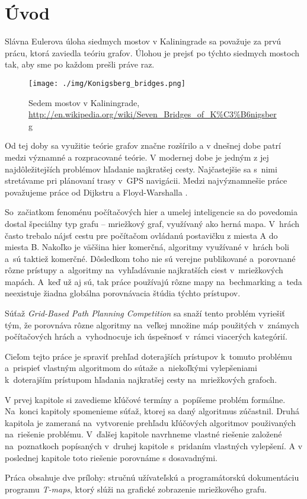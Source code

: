 \chapter*{Úvod}

Slávna Eulerova úloha siedmych mostov v Kaliningrade \cite{euler41} sa považuje za prvú prácu, 
ktorá zaviedla teóriu grafov.
Úlohou je prejsť po týchto siedmych mostoch tak, aby sme po každom prešli práve raz.


\begin{figure}[h]
\centering
\texttt{[image: ./img/Konigsberg\_bridges.png]}
\caption{Sedem mostov v Kaliningrade, \url{http://en.wikipedia.org/wiki/Seven_Bridges_of_K\%C3\%B6nigsberg}}
\label{fig:konigsberg_bridges}
\end{figure}

 
Od tej doby sa využitie teórie grafov značne
rozšírilo a v dnešnej dobe patrí medzi významné
a rozpracované teórie. V modernej dobe je jedným z jej 
naj\-dô\-le\-ži\-tej\-ších 
problémov hľadanie najkratšej cesty. Najčastejšie sa s~nimi stretávame pri plánovaní trasy v~GPS navigácii.
Medzi najvýznamnešie práce považujeme práce od Dijkstru \cite{dijkstra59} a Floyd-Warshalla \cite{floyd62}.

So~začiatkom fenoménu počítačových hier 
a umelej inteligencie sa do povedomia dostal špeciálny typ grafu --
mriežkový graf, využívaný ako herná mapa.
V~hrách často trebalo nájsť cestu pre počítačom
ovládanú postavičku z miesta A do miesta B.
Nakoľko je väčšina hier komerčná, algoritmy
využívané v~hrách boli a~sú taktiež komerčné.
Dôsledkom toho nie sú verejne publikované a~porovnané rôzne prístupy a~algoritmy
na~vyhľadávanie najkratších ciest v~mriežkových mapách. A~keď už aj sú, tak práce používajú rôzne mapy
na~bechmarking a~teda neexistuje žiadna globálna porovnávacia štúdia týchto prístupov.

Súťaž {\sl Grid-Based Path Planning Competition}
 \cite{sturtevantgppc} sa snaží tento problém vyriešiť tým, že porovnáva rôzne algoritmy na~veľkej množine máp
použitých v~známych počítačových hrách a~vyhodnocuje ich úspešnosť v~rámci viacerých kategórií.

Cieľom tejto práce je spraviť prehľad doterajších prístupov k~tomuto problému a~prispieť vlastným algoritmom do sútaže a~niekoľkými vylepšeniami k~doterajším prístupom hľadania najkratšej cesty na~mriežkových grafoch.

V prvej kapitole si zavedieme kľúčové termíny a~popíšeme problém formálne. Na~konci kapitoly spomenieme súťaž, ktorej sa daný algoritmus zúčastnil.
Druhá kapitola je zameraná na~vytvorenie prehľadu kľúčových algoritmov použivaných na~riešenie problému.
V~ďalšej kapitole navrhneme vlastné riešenie založené na~poznatkoch popísaných v~druhej kapitole s~pridaním vlastných vylepšení.
A v poslednej kapitole toto riešenie porovnáme s dosavadnými.

Práca obsahuje dve prílohy: stručnú užívateľskú a programátorskú do\-ku\-men\-tá\-ciu programu \emph{T-maps}, ktorý slúži na grafické zobrazenie mriežkového grafu.

